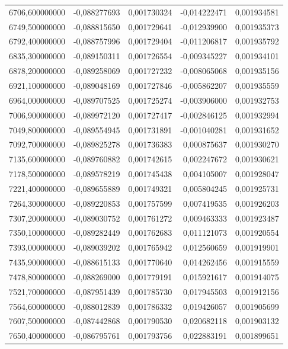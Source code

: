 \begin{longtable}{rrrrr}
6706,600000000 & -0,088277693 & 0,001730324 & -0,014222471 & 0,001934581\\
6749,500000000 & -0,088815650 & 0,001729641 & -0,012939900 & 0,001935373\\
6792,400000000 & -0,088757996 & 0,001729404 & -0,011206817 & 0,001935792\\
6835,300000000 & -0,089150311 & 0,001726554 & -0,009345227 & 0,001934101\\
6878,200000000 & -0,089258069 & 0,001727232 & -0,008065068 & 0,001935156\\
6921,100000000 & -0,089048169 & 0,001727846 & -0,005862207 & 0,001935559\\
6964,000000000 & -0,089707525 & 0,001725274 & -0,003906000 & 0,001932753\\
7006,900000000 & -0,089972120 & 0,001727417 & -0,002846125 & 0,001932994\\
7049,800000000 & -0,089554945 & 0,001731891 & -0,001040281 & 0,001931652\\
7092,700000000 & -0,089825278 & 0,001736383 & 0,000875637 & 0,001930270\\
7135,600000000 & -0,089760882 & 0,001742615 & 0,002247672 & 0,001930621\\
7178,500000000 & -0,089578219 & 0,001745438 & 0,004105007 & 0,001928047\\
7221,400000000 & -0,089655889 & 0,001749321 & 0,005804245 & 0,001925731\\
7264,300000000 & -0,089220853 & 0,001757599 & 0,007419535 & 0,001926203\\
7307,200000000 & -0,089030752 & 0,001761272 & 0,009463333 & 0,001923487\\
7350,100000000 & -0,089282449 & 0,001762683 & 0,011121073 & 0,001920554\\
7393,000000000 & -0,089039202 & 0,001765942 & 0,012560659 & 0,001919901\\
7435,900000000 & -0,088615133 & 0,001770640 & 0,014262456 & 0,001915559\\
7478,800000000 & -0,088269000 & 0,001779191 & 0,015921617 & 0,001914075\\
7521,700000000 & -0,087951439 & 0,001785730 & 0,017945503 & 0,001912156\\
7564,600000000 & -0,088012839 & 0,001786332 & 0,019426057 & 0,001905699\\
7607,500000000 & -0,087442868 & 0,001790530 & 0,020682118 & 0,001903132\\
7650,400000000 & -0,086795761 & 0,001793756 & 0,022883191 & 0,001899651\\

\end{longtable}
